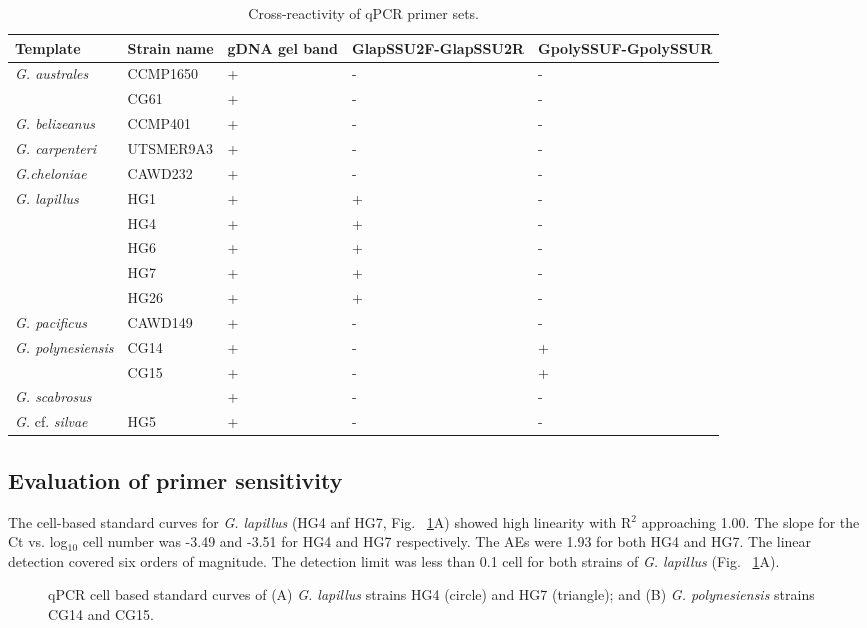 \documentclass[12pt]{article}
\begin{document}
\FloatBarrier
\begin{table}
\caption{Cross-reactivity of qPCR primer sets.}
\label{tbl:CrossreactTable}
\begin{tabular}{ | p{4cm} | p{3cm} | p{2cm} | p{2.5cm} | p{2.5cm} | }
\hline
\textbf{Template} & \textbf{Strain name} & \textbf{gDNA gel band} & \textbf{GlapSSU2F-GlapSSU2R} & \textbf{GpolySSUF-GpolySSUR} \\
\hline
\emph{G. australes} & CCMP1650 &+&-&- \\
\hline
& CG61 &+&-&- \\
\hline
\emph{G. belizeanus}&CCMP401&+&-&-\\
\hline
\emph{G. carpenteri}&UTSMER9A3&+&-&-\\
\hline
\emph{G.cheloniae}&CAWD232&+&-&-\\
\hline
\emph{G. lapillus}&HG1&+&+&-\\
\hline
&HG4&+&+&-\\
\hline
&HG6&+&+&-\\
\hline
&HG7&+&+&-\\
\hline
&HG26&+&+&-\\
\hline
\emph{G. pacificus}&CAWD149&+&-&-\\
\hline
\emph{G. polynesiensis}&CG14&+&-&+\\
\hline
&CG15&+&-&+\\
\hline
\emph{G. scabrosus}&&+&-&-\\
\hline
\emph{G.} cf. \emph{silvae}&HG5&+&-&-\\
\hline
\end{tabular}
\end{table}
\FloatBarrier
 
\subsection{Evaluation of primer sensitivity}
The cell-based standard curves for \emph{G. lapillus} (HG4 anf HG7, Fig. ~\ref{fig:lapiStd}A) showed high linearity with R$^{2}$ approaching 1.00. The slope for the Ct vs. log$_{10}$ cell number was -3.49 and -3.51 for HG4 and HG7 respectively. The AEs were 1.93 for both HG4 and HG7. The linear detection covered six orders of magnitude. The detection limit was less than 0.1 cell for both strains of \emph{G. lapillus} (Fig. ~\ref{fig:lapiStd}A).
\begin{figure}
\caption{qPCR cell based standard curves of (A) \emph{G. lapillus} strains HG4 (circle) and HG7 (triangle); and (B) \emph{G. polynesiensis} strains CG14 and CG15.} %
\label{fig:lapiStd}
\end{figure}
\FloatBarrier
\end{document}
